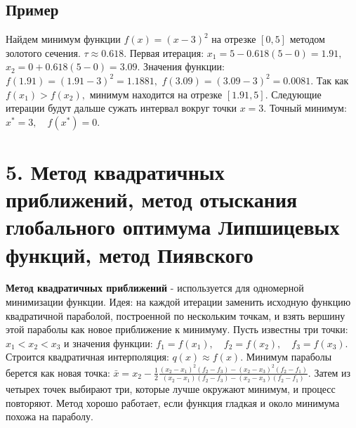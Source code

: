 \documentclass[12pt,a4paper]{article}
\begin{document}
\subsection{Пример}
Найдем минимум функции $f(x)=(x-3)^2$
на отрезке $[0,5]$ методом золотого сечения. $\tau \approx 0.618.$
Первая итерация: $x_1=5-0.618(5-0)=1.91,$ $x_2=0+0.618(5-0)=3.09.$
Значения функции: $f(1.91)=(1.91-3)^2=1.1881,$ $f(3.09)=(3.09-3)^2=0.0081.$
Так как $f(x_1)>f(x_2),$
минимум находится на отрезке $[1.91,5].$
Следующие итерации будут дальше сужать интервал вокруг точки $x=3$. Точный минимум: $x^*=3,\quad f(x^*)=0.$
\section{5. Метод квадратичных приближений, метод отыскания глобального оптимума Липшицевых функций, метод Пиявского}
\textbf{Метод квадратичных приближений} - используется для одномерной минимизации функции. Идея: на каждой итерации заменить исходную функцию квадратичной параболой, построенной по нескольким точкам, и взять вершину этой параболы как новое приближение к минимуму.
Пусть известны три точки: $x_1 < x_2 < x_3$
и значения функции: $f_1=f(x_1),\quad f_2=f(x_2),\quad f_3=f(x_3).$
Строится квадратичная интерполяция: $q(x) \approx f(x).$
Минимум параболы берется как новая точка: $\bar{x} = x_2 - \frac{1}{2} \frac{(x_2-x_1)^2(f_2-f_3)-(x_2-x_3)^2(f_2-f_1)} {(x_2-x_1)(f_2-f_3)-(x_2-x_3)(f_2-f_1)}.$
Затем из четырех точек выбирают три, которые лучше окружают минимум, и процесс повторяют.
Метод хорошо работает, если функция гладкая и около минимума похожа на параболу.
\end{document}
